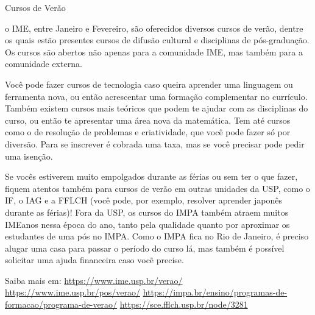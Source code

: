 \begin{secao}{Cursos de Verão}

o IME, entre Janeiro e Fevereiro, são oferecidos diversos cursos de verão,
dentre os quais estão presentes cursos de difusão cultural e disciplinas de
pós-graduação. Os cursos são abertos não apenas para a comunidade IME, mas
também para a comunidade externa.

Você pode fazer cursos de tecnologia caso queira aprender uma linguagem ou ferramenta nova, 
ou então acrescentar uma formação complementar no currículo. Também existem cursos mais teóricos 
que podem te ajudar com as disciplinas do curso, ou então te apresentar uma área nova da matemática. 
Tem até cursos como o de resolução de problemas e criatividade, que você pode fazer só por diversão. 
Para se inscrever é cobrada uma taxa, mas se você precisar pode pedir uma isenção. 

Se vocês estiverem muito empolgados durante as férias ou sem ter o que fazer, fiquem atentos também para 
cursos de verão em outras unidades da USP, como o IF, o IAG e a FFLCH (você pode, por exemplo, resolver aprender 
japonês durante as férias)! Fora da USP, os cursos do IMPA também atraem muitos IMEanos nessa época do ano, tanto 
pela qualidade quanto por aproximar os estudantes de uma pós no IMPA. Como o IMPA fica no Rio de Janeiro, é preciso 
alugar uma casa para passar o período do curso lá, mas também é possível solicitar uma ajuda financeira caso vocẽ precise.


Saiba mais em: 
\url{https://www.ime.usp.br/verao/}
\url{https://www.ime.usp.br/pos/verao/}
\url{https://impa.br/ensino/programas-de-formacao/programa-de-verao/}
\url{https://sce.fflch.usp.br/node/3281}

\end{secao}
